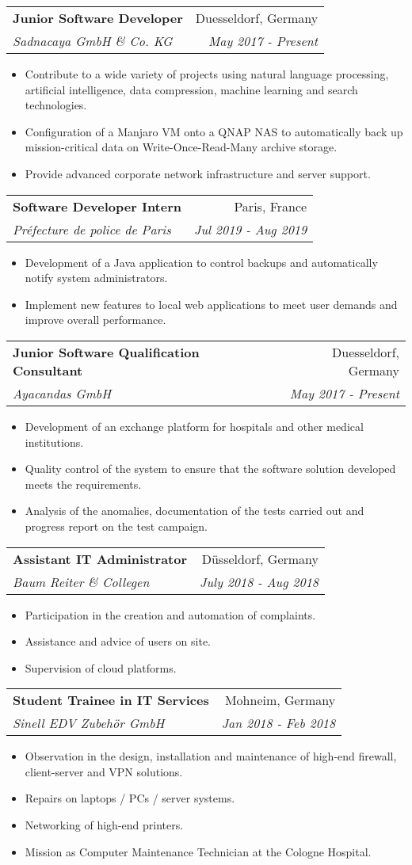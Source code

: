 \documentclass[a4paper,11pt]{article}
\makeatletter
\newcommand{\resumeItem}[2]{
  \item\small{
    \textbf{#1}{ #2 \vspace{-2pt}}
  }
}
\newcommand{\resumeSubheading}[4]{
  \vspace{-1pt}\item
    \begin{tabular*}{0.97\textwidth}{l@{\extracolsep{\fill}}r}
      \textbf{#1} & #2 \\
      \textit{\small#3} & \textit{\small #4} \\
    \end{tabular*}\vspace{-5pt}
}
\newcommand{\resumeItemListStart}{\begin{itemize}}
\newcommand{\resumeItemListEnd}{\end{itemize}\vspace{-5pt}}
\makeatother
\begin{document}
    \resumeSubheading
      {Junior Software Developer}{Duesseldorf, Germany}
      {Sadnacaya GmbH \& Co. KG}{May 2017 - Present}
      \resumeItemListStart
        \resumeItem{}
          {Contribute to a wide variety of projects using natural language processing, artificial intelligence, data compression, machine learning and search technologies.}
        \resumeItem{}
          {Configuration of a Manjaro VM onto a QNAP NAS to automatically back up mission-critical data on Write-Once-Read-Many archive storage.}
        \resumeItem{}
          {Provide advanced corporate network infrastructure and server support.}
      \resumeItemListEnd

    \resumeSubheading
      {Software Developer Intern}{Paris, France}
      {Préfecture de police de Paris}{Jul 2019 - Aug 2019}
      \resumeItemListStart
        \resumeItem{}
          {Development of a Java application to control backups and automatically notify system administrators.}
        \resumeItem{}
          {Implement new features to local web applications to meet user demands and improve overall performance.}
      \resumeItemListEnd

\iffalse
    \resumeSubheading
      {Junior Software Qualification Consultant}{Duesseldorf, Germany}
      {Ayacandas GmbH}{May 2017 - Present}
      \resumeItemListStart
        \resumeItem{}
          {Development of an exchange platform for hospitals and other medical institutions.}
        \resumeItem{}
          {Quality control of the system to ensure that the software solution developed meets the requirements.}
        \resumeItem{}
          {Analysis of the anomalies, documentation of the tests carried out and progress report on the test campaign.}
      \resumeItemListEnd
      
    \resumeSubheading
      {Assistant IT Administrator}{Düsseldorf, Germany}
      {Baum Reiter \& Collegen}{July 2018 - Aug 2018}
      \resumeItemListStart
        \resumeItem{}
          {Participation in the creation and automation of complaints.}
        \resumeItem{}
          {Assistance and advice of users on site.}
        \resumeItem{}
          {Supervision of cloud platforms.}
      \resumeItemListEnd
      
      \resumeSubheading
      {Student Trainee in IT Services}{Mohneim, Germany}
      {Sinell EDV Zubehör GmbH}{Jan 2018 - Feb 2018}
      \resumeItemListStart
        \resumeItem{}
          {Observation in the design, installation and maintenance of high-end firewall, client-server and VPN solutions.}
        \resumeItem{}
          {Repairs on laptops / PCs / server systems.}
        \resumeItem{}
          {Networking of high-end printers.}
        \resumeItem{}
          {Mission as Computer Maintenance Technician at the Cologne Hospital.}
      \resumeItemListEnd
      
\end{document}
